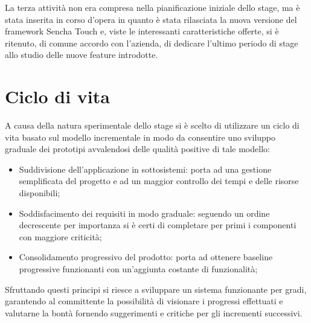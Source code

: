 La terza attività non era compresa nella pianificazione iniziale dello stage, ma è stata inserita in corso d'opera in quanto è stata rilasciata la nuova versione del framework Sencha Touch e, viste le interessanti caratteristiche offerte, si è ritenuto, di comune accordo con l'azienda, di dedicare l'ultimo periodo di stage allo studio delle nuove feature introdotte.

\section{Ciclo di vita}
A causa della natura sperimentale dello stage si è scelto di utilizzare un ciclo di vita basato sul modello incrementale in modo da consentire uno sviluppo graduale dei prototipi avvalendosi delle qualità positive di tale modello:
\begin{itemize}
\item Suddivisione dell'applicazione in sottosistemi: porta ad una gestione semplificata del progetto e ad un maggior controllo dei tempi e delle risorse disponibili;
\item Soddisfacimento dei requisiti in modo graduale: seguendo un ordine decrescente per importanza si è certi di completare per primi i componenti con maggiore criticità;
\item Consolidamento progressivo del prodotto: porta ad ottenere baseline progressive funzionanti con un'aggiunta costante di funzionalità;
\end{itemize}
Sfruttando questi principi si riesce a sviluppare un sistema funzionante per gradi, garantendo al committente la possibilità di visionare i progressi effettuati e valutarne la bontà fornendo suggerimenti e critiche per gli incrementi successivi.